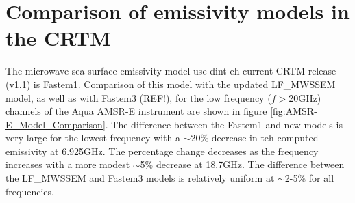\section{Comparison of emissivity models in the CRTM}

The microwave sea surface emissivity model use dint eh current CRTM release (v1.1) is Fastem1\cite{Fastem1}. Comparison of this model with the updated LF\_MWSSEM model, as well as with Fastem3 (REF!), for the low frequency ($f\!>$20GHz) channels of the Aqua AMSR-E instrument are shown in figure \ref{fig:AMSR-E_Model_Comparison}. The difference between the Fastem1 and new models is very large for the lowest frequency with a $\sim$20\% decrease in teh computed emissivity at 6.925GHz. The percentage change decreases as the frequency increases with a more modest $\sim$5\% decrease at 18.7GHz. The difference between the LF\_MWSSEM and Fastem3 models is relatively uniform at $\sim$2-5\% for all frequencies.

